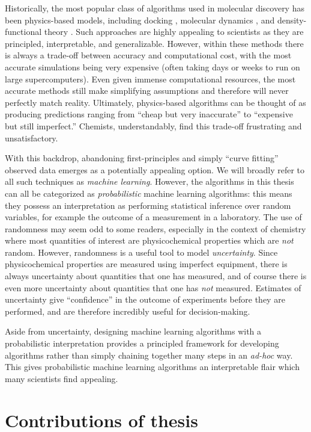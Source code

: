 Historically, the most popular class of algorithms used in molecular discovery has been physics-based models,
including docking \citep{pinzi2019molecular}, molecular dynamics \citep{durrant2011molecular},
and density-functional theory \citep{jones2015density}.
Such approaches are highly appealing to scientists as they are principled,
interpretable, and generalizable.
However, within these methods there is always a trade-off between accuracy and computational cost,
with the most accurate simulations being very expensive
(often taking days or weeks to run on large supercomputers).
Even given immense computational resources, the most accurate methods still make simplifying
assumptions and therefore will never perfectly match reality.
Ultimately, physics-based algorithms can be thought of as producing predictions ranging from
``cheap but very inaccurate'' to ``expensive but still imperfect.''
Chemists, understandably, find this trade-off frustrating and unsatisfactory.


With this backdrop, abandoning first-principles and simply ``curve fitting'' observed data emerges as a potentially appealing option.
We will broadly refer to all such techniques as \emph{machine learning}.
However, the algorithms in this thesis can all be categorized as \emph{probabilistic} machine learning algorithms:
this means they possess an interpretation as performing statistical inference over random variables,
for example the outcome of a measurement in a laboratory.
The use of randomness may seem odd to some readers, especially in the context of chemistry
where most quantities of interest are physicochemical properties
which are \emph{not} random.
However, randomness is a useful tool to model \emph{uncertainty}.
Since physicochemical properties are measured using imperfect equipment,
there is always uncertainty about quantities that one has measured,
and of course there is even more uncertainty about quantities that one has \emph{not} measured.
Estimates of uncertainty give ``confidence'' in the outcome of experiments before they are performed,
and are therefore incredibly useful for decision-making.

Aside from uncertainty, designing machine learning algorithms with a
probabilistic interpretation provides a principled framework for developing algorithms
rather than simply chaining together many steps in an \textit{ad-hoc} way.
This gives probabilistic machine learning algorithms an interpretable flair
which many scientists find appealing.

\section{Contributions of thesis}
\label{sec:intro:contributions}

